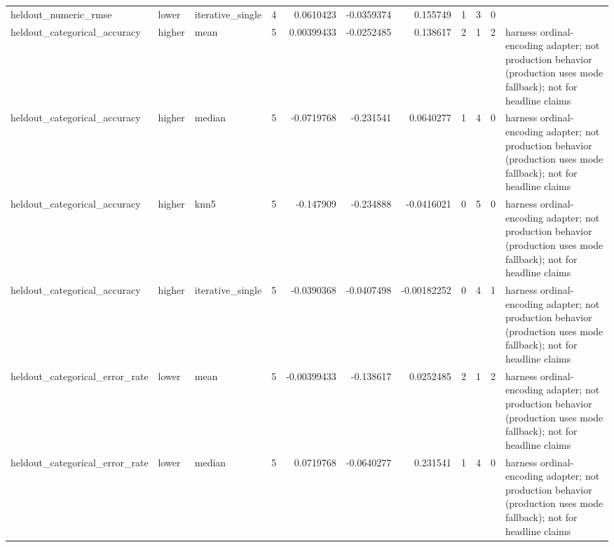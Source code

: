 \begin{table}[ht]
{\begin{tabular}{lllrrrrrrrl}
 heldout\_numeric\_rmse           & lower              & iterative\_single &            4 &                            0.0610423   &          -0.0359374   &             0.155749   &                         1 &                        3 &                                0 &                                                                                                                    \\
 heldout\_categorical\_accuracy   & higher             & mean             &            5 &                            0.00399433  &          -0.0252485   &             0.138617   &                         2 &                        1 &                                2 & harness ordinal-encoding adapter; not production behavior (production uses mode fallback); not for headline claims \\
 heldout\_categorical\_accuracy   & higher             & median           &            5 &                           -0.0719768   &          -0.231541    &             0.0640277  &                         1 &                        4 &                                0 & harness ordinal-encoding adapter; not production behavior (production uses mode fallback); not for headline claims \\
 heldout\_categorical\_accuracy   & higher             & knn5             &            5 &                           -0.147909    &          -0.234888    &            -0.0416021  &                         0 &                        5 &                                0 & harness ordinal-encoding adapter; not production behavior (production uses mode fallback); not for headline claims \\
 heldout\_categorical\_accuracy   & higher             & iterative\_single &            5 &                           -0.0390368   &          -0.0407498   &            -0.00182252 &                         0 &                        4 &                                1 & harness ordinal-encoding adapter; not production behavior (production uses mode fallback); not for headline claims \\
 heldout\_categorical\_error\_rate & lower              & mean             &            5 &                           -0.00399433  &          -0.138617    &             0.0252485  &                         2 &                        1 &                                2 & harness ordinal-encoding adapter; not production behavior (production uses mode fallback); not for headline claims \\
 heldout\_categorical\_error\_rate & lower              & median           &            5 &                            0.0719768   &          -0.0640277   &             0.231541   &                         1 &                        4 &                                0 & harness ordinal-encoding adapter; not production behavior (production uses mode fallback); not for headline claims \\

\end{tabular}}
\end{table}
